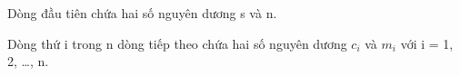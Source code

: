 Dòng đầu tiên chứa hai số nguyên dương s và n.

Dòng thứ i trong n dòng tiếp theo chứa hai số nguyên dương $c_{i}$ và $m_{i}$ với i = 1, 2, …, n.